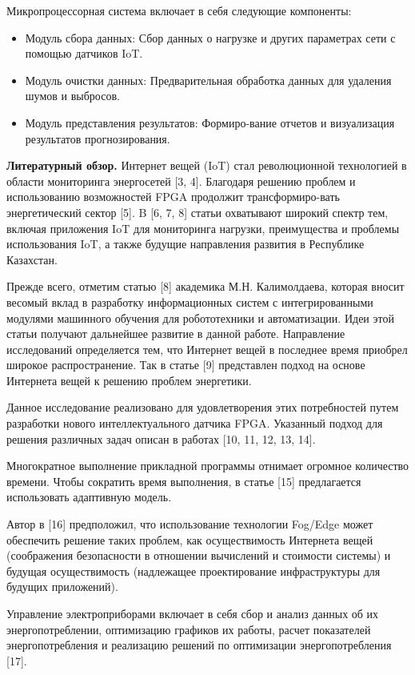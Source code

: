 \begin{multicols}{2}
Микропроцессорная система включает в себя следующие компоненты:

\begin{itemize}
\item
  Модуль сбора данных: Сбор данных о нагрузке и других параметрах сети с
  помощью датчиков IoT.
\item
  Модуль очистки данных: Предварительная обработка данных для удаления
  шумов и выбросов.
\item
  Модуль представления результатов: Формиро-вание отчетов и визуализация
  результатов прогнозирования.
\end{itemize}

{\bfseries Литературный обзор.} Интернет вещей (IoT) стал революционной
технологией в области мониторинга энергосетей {[}3, 4{]}. Благодаря
решению проблем и использованию возможностей FPGA продолжит
трансформиро-вать энергетический сектор {[}5{]}. B {[}6, 7, 8{]} статьи
охватывают широкий спектр тем, включая приложения IoT для мониторинга
нагрузки, преимущества и проблемы использования IoT, а также будущие
направления развития в Республике Казахстан.

Прежде всего, отметим статью {[}8{]} академика М.Н. Калимолдаева,
которая вносит весомый вклад в разработку информационных систем с
интегрированными модулями машинного обучения для робототехники и
автоматизации. Идеи этой статьи получают дальнейшее развитие в данной
работе. Направление исследований определяется тем, что Интернет вещей в
последнее время приобрел широкое распространение. Так в статье {[}9{]}
представлен подход на основе Интернета вещей к решению проблем
энергетики.

Данное исследование реализовано для удовлетворения этих потребностей
путем разработки нового интеллектуального датчика FPGA. Указанный подход
для решения различных задач описан в работах {[}10, 11, 12, 13, 14{]}.

Многократное выполнение прикладной программы отнимает огромное
количество времени. Чтобы сократить время выполнения, в статье {[}15{]}
предлагается использовать адаптивную модель.

Автор в {[}16{]} предположил, что использование технологии Fog/Edge
может обеспечить решение таких проблем, как осуществимость Интернета
вещей (соображения безопасности в отношении вычислений и стоимости
системы) и будущая осуществимость (надлежащее проектирование
инфраструктуры для будущих приложений).

Управление электроприборами включает в себя сбор и анализ данных об их
энергопотреблении, оптимизацию графиков их работы, расчет показателей
энергопотребления и реализацию решений по оптимизации энергопотребления
{[}17{]}.


\end{multicols}
